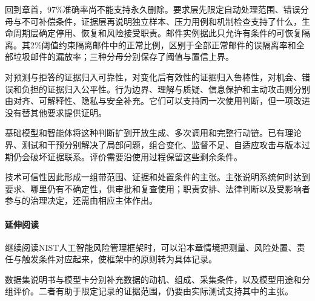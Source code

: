 回到章首，97\%准确率尚不能支持永久删除。要求层先限定自动处理范围、错误分母与不可补偿条件，证据层再说明独立样本、压力用例和机制检查支持了什么，生命周期层确定停用、恢复和风险接受职责。邮件实例据此只允许有条件的可恢复隔离。其2\%阈值约束隔离邮件中的正常比例，区别于全部正常邮件的误隔离率和全部垃圾邮件的漏放率；三种分母分别保存了阈值与置信上界。

对预测与拒答的证据归入可靠性，对变化后有效性的证据归入鲁棒性，对机会、错误和负担的证据归入公平性。行为边界、理解与质疑、信息保护和主动攻击则分别由对齐、可解释性、隐私与安全补充。它们可以支持同一次使用判断，但一项改进没有替其他要求提供证明。

基础模型和智能体将这种判断扩到开放生成、多次调用和完整行动链。已有理论界、测试和干预分别解决了局部问题，组合变化、监督不足、自适应攻击与版本过期仍会破坏证据联系。评价需要沿使用过程保留这些剩余条件。

技术可信性因此形成一组带范围、证据和处置条件的主张。主张说明系统何时达到要求、哪里仍有不确定性，供审批和复查使用；职责安排、法律判断以及受影响者参与的治理决定，还需由相应主体作出。

\paragraph{延伸阅读}

继续阅读NIST人工智能风险管理框架时，可以沿本章情境把测量、风险处置、责任与触发条件对应起来，使框架中的原则转为具体记录。

数据集说明书与模型卡分别补充数据的动机、组成、采集条件，以及模型用途和分组评价。二者有助于限定记录的证据范围，仍要由实际测试支持其中的主张。
